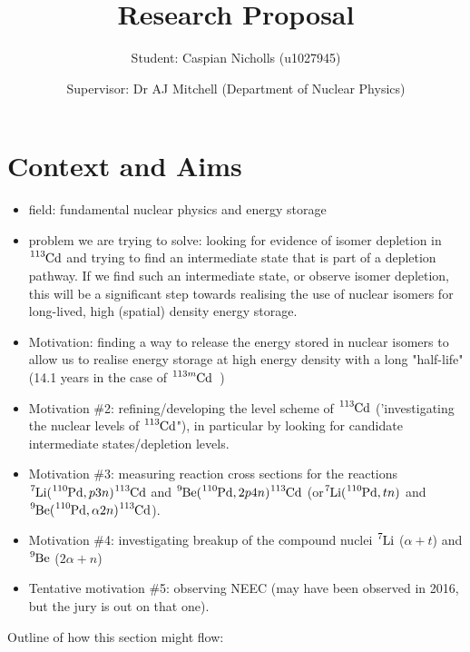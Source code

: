 \documentclass[12pt,a4paper]{article}
\begin{document}
\title{Research Proposal}
\author{Student: Caspian Nicholls (u1027945)}
\date{Supervisor: Dr AJ Mitchell (Department of Nuclear Physics)}

\maketitle
\section*{Context and Aims}

\begin{itemize}
\item field: fundamental nuclear physics and energy storage
\item problem we are trying to solve: looking for evidence of isomer depletion in  $\ce{^{113}Cd}$ and trying to find an intermediate state that is part of a depletion pathway. If we find such an intermediate state, or observe isomer depletion, this will be a significant step towards realising the use of nuclear isomers for long-lived, high (spatial) density energy storage.
\item Motivation: finding a way to release the energy stored in nuclear isomers to allow us to realise energy storage at high energy density with a long "half-life" (14.1 years in the case of $\ce{^{113m}Cd}$~\cite{shaffer_innovations_2018})
\item Motivation \#2: refining/developing the level scheme of $\ce{^{113}Cd}$ ('investigating the nuclear levels of  $\ce{^{113}Cd}$"), in particular by looking for candidate intermediate states/depletion levels. 
\item Motivation \#3: measuring reaction cross sections for the reactions $\ce{^{7}Li}(\ce{^{110}Pd},p3n)\ce{^{113}Cd}$ and $\ce{^{9}Be}(\ce{^{110}Pd},2p4n)\ce{^{113}Cd}$ (or$\ce{^{7}Li}(\ce{^{110}Pd},tn)$ and $\ce{^{9}Be}(\ce{^{110}Pd},\alpha 2n)\ce{^{113}Cd}$).
\item Motivation \#4: investigating breakup of the compound nuclei $\ce{^{7}Li}$ ($\alpha + t$) and $\ce{^{9}Be}$ ($2\alpha+n$)~\cite{curtis_+li_2005,von_oertzen_two-center_1996,von_oertzen_dimers_1997,soic_-decaying_2004,poletti_structure_1994}
\item Tentative motivation \#5: observing NEEC (may have been observed in 2016, but the jury is out on that one). 
\end{itemize}
Outline of how this section might flow:
\end{document}
